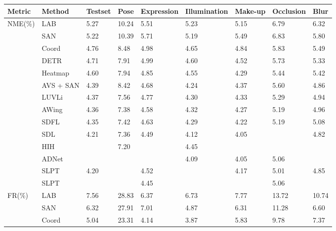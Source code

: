 \documentclass[10pt,twocolumn,letterpaper]{article}
\begin{document}
\begin{table}[H]
	\centering
	\begin{tabular}{m{1.7cm}<{\centering}|m{2.6cm}<{\centering}|m{1.2cm}<{\centering}|m{1.2cm}<{\centering}|m{1.4cm}<{\centering}|m{1.6cm}<{\centering}|m{1.3cm}<{\centering}|m{1.3cm}<{\centering}|m{1.2cm}<{\centering}}
		\hline
		Metric    & Method    & Testset & Pose  & Expression & Illumination & Make-up & Occlusion & Blur  \\ \hline
		\multirow{14}{*}{NME(\%)}
		& LAB \cite{LAB} & 5.27 & 10.24 & 5.51 & 5.23 & 5.15 & 6.79 & 6.32 \\
		& SAN \cite{SAN} & 5.22 & 10.39 & 5.71 & 5.19 & 5.49 & 6.83 & 5.80 \\
		& Coord \cite{HRnet} & 4.76 & 8.48 & 4.98 & 4.65 & 4.84 & 5.83 & 5.49 \\
		& DETR \cite{DETR} & 4.71 & 7.91 & 4.99 & 4.60 & 4.52 & 5.73 & 5.33 \\
		& Heatmap \cite{HRnet} & 4.60 & 7.94 & 4.85 & 4.55 & 4.29 & 5.44 & 5.42 \\
		& AVS + SAN \cite{AVS} & 4.39 & 8.42 & 4.68 & 4.24 & 4.37 & 5.60 & 4.86 \\
		& LUVLi \cite{LUVLI} & 4.37 & 7.56 & 4.77 & 4.30 & 4.33 & 5.29 & 4.94 \\
		& AWing \cite{AFW} & 4.36 & 7.38 & 4.58 & 4.32 & 4.27 & 5.19 & 4.96 \\
		& SDFL \cite{SCDF}  & 4.35 & 7.42 & 4.63 & 4.29 & 4.22 & 5.19 & 5.08 \\ 
		& SDL \cite{SDL} & 4.21 & 7.36 & 4.49 & 4.12 & 4.05 & {\color{red} } & 4.82 \\ 
		& HIH \cite{HIH} & {\color{blue} } & 7.20 & {\color{red} } & 4.45 & {\color{red} } & {\color{blue} } &{\color{blue} } \\ 
		& ADNet \cite{ADNet} & {\color{red}} & {\color{red}} & {\color{blue} } & 4.09 & 4.05 & 5.06 & {\color{red} } \\ \cline{2-9}
		& SLPT & 4.20 & {\color{blue} }& 4.52 & {\color{blue} } & 4.17 & 5.01 & 4.85 \\
		& SLPT & {\color{red}} & {\color{red}} & 4.45 & {\color{red} } & {\color{blue} } & 5.06 & {\color{red} } \\ \hline
		\multirow{14}{*}{FR(\%)}
		& LAB & 7.56 & 28.83 & 6.37 & 6.73 & 7.77 & 13.72 & 10.74 \\
		& SAN & 6.32 & 27.91 & 7.01 & 4.87 & 6.31 & 11.28 & 6.60 \\
		& Coord & 5.04 & 23.31 & 4.14 & 3.87 & 5.83 & 9.78 & 7.37 \\

\end{tabular}
\end{table}
\end{document}
